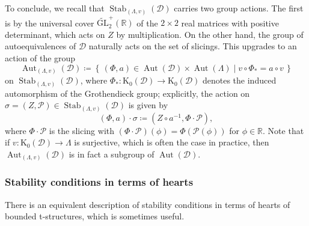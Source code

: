 \documentclass[11pt, reqno]{amsart}
\numberwithin{equation}{section}
\theoremstyle{plain}
\theoremstyle{remark}
\theoremstyle{definition}
\theoremstyle{italicsname}
\newcommand{\st}{\mid}
\newcommand{\set}[1]{\left\{ \, #1 \, \right\}}
\DeclareMathOperator{\Stab}{Stab}
\DeclareMathOperator{\Aut}{Aut}
\newcommand{\cD}{\mathscr{D}}
\newcommand{\cP}{\mathscr{P}}
\newcommand{\rK}{\mathrm{K}}
\def\RR{\ensuremath{\mathbb{R}}}
\begin{document}
To conclude, we recall that $\Stab_{(\Lambda, v)}(\cD)$ carries two group actions.
The first is by the universal cover $\widetilde{\mathrm{GL}}_2^+(\RR)$ of the $2\times2$ real matrices with positive determinant, which acts on $Z$ by multiplication.
On the other hand, the group of autoequivalences of $\cD$ naturally acts on the set of slicings. 
This upgrades to an action of the group 
\begin{equation}
\label{AutLambdav}
    \Aut_{(\Lambda, v)}(\cD) \coloneqq \set{ (\Phi, a) \in \Aut(\cD) \times \Aut(\Lambda) \st v \circ \Phi_* = a \circ v}
\end{equation}
on $\Stab_{(\Lambda, v)}(\cD)$, 
where $\Phi_* \colon \rK_0(\cD) \to \rK_0(\cD)$ denotes the induced automorphism of the Grothendieck group; explicitly, the action on $\sigma = (Z, \cP) \in \Stab_{(\Lambda, v)}(\cD)$ is given by 
\begin{equation*}
    (\Phi, a) \cdot \sigma \coloneqq (Z \circ a^{-1}, \Phi \cdot \cP), 
\end{equation*}
where $\Phi \cdot \cP$ is the slicing with $(\Phi \cdot \cP)(\phi) = \Phi(\cP(\phi))$ for $\phi \in \RR$. 
Note that if $v \colon \rK_0(\cD) \to \Lambda$ is surjective, which is often the case in practice, then $\Aut_{(\Lambda, v)}(\cD)$ is in fact a subgroup of $\Aut(\cD)$.

\subsubsection{Stability conditions in terms of hearts}
There is an equivalent description of stability conditions in terms of hearts of bounded t-structures, which is sometimes useful. 
\end{document}
